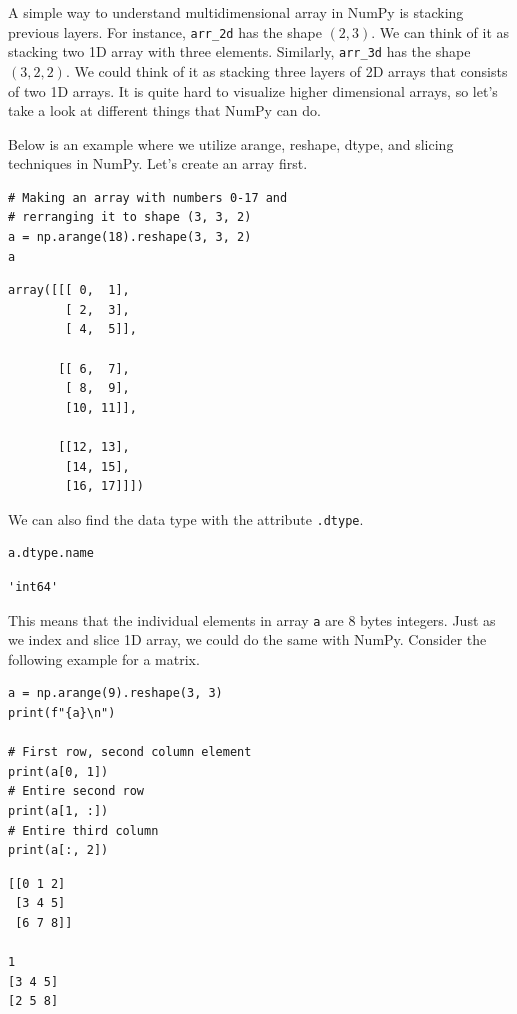 \documentclass[../../main.tex]{subfiles}
\begin{document}
A simple way to understand multidimensional array in NumPy is
stacking previous layers. For instance, \verb|arr_2d| has the
shape $(2, 3)$. We can think of it as stacking two 1D array
with three elements. Similarly, \verb|arr_3d| has the shape
$(3, 2, 2)$. We could think of it as stacking three layers of
2D arrays that consists of two 1D arrays. It is quite hard
to visualize higher dimensional arrays, so let's take a look
at different things that NumPy can do.

Below is an example where we utilize arange, reshape, dtype,
and slicing techniques in NumPy. Let's create an array first.

\begin{jupyter}
\begin{lstlisting}[style=jin]
# Making an array with numbers 0-17 and
# rerranging it to shape (3, 3, 2)
a = np.arange(18).reshape(3, 3, 2)
a
\end{lstlisting}

\begin{lstlisting}[style=jout]
array([[[ 0,  1],
        [ 2,  3],
        [ 4,  5]],

       [[ 6,  7],
        [ 8,  9],
        [10, 11]],

       [[12, 13],
        [14, 15],
        [16, 17]]])
\end{lstlisting}
\end{jupyter}

We can also find the data type with the attribute \verb|.dtype|.

\begin{jupyter}
\begin{lstlisting}[style=jin]
a.dtype.name
\end{lstlisting}

\begin{lstlisting}[style=jout]
'int64'
\end{lstlisting}
\end{jupyter}

This means that the individual elements in array \verb|a| are 8
bytes integers. Just as we index and slice 1D array, we could
do the same with NumPy. Consider the following example for a
matrix.

\begin{jupyter}
\begin{lstlisting}[style=jin]
a = np.arange(9).reshape(3, 3)
print(f"{a}\n")

# First row, second column element
print(a[0, 1])
# Entire second row
print(a[1, :])
# Entire third column
print(a[:, 2])
\end{lstlisting}

\begin{lstlisting}[style=jout]
[[0 1 2]
 [3 4 5]
 [6 7 8]]

1
[3 4 5]
[2 5 8]
\end{lstlisting}
\end{jupyter}
\end{document}
